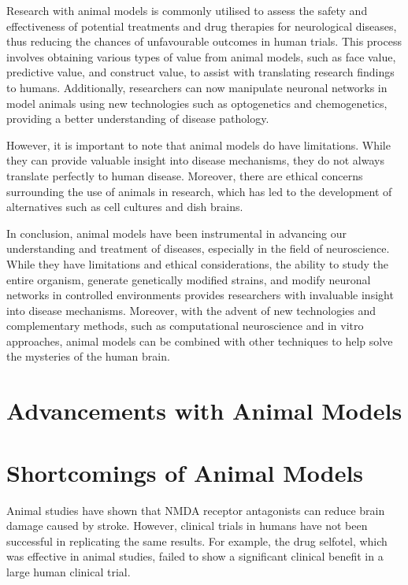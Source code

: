 \documentclass[10pt]{article}
\begin{document}
\begin{sloppypar}
  Research with animal models is commonly utilised to assess the safety and effectiveness of potential treatments and drug therapies for neurological diseases, thus reducing the chances of unfavourable outcomes in human trials. This process involves obtaining various types of value from animal models, such as face value, predictive value, and construct value, to assist with translating research findings to humans. Additionally, researchers can now manipulate neuronal networks in model animals using new technologies such as optogenetics and chemogenetics, providing a better understanding of disease pathology.

  However, it is important to note that animal models do have limitations. While they can provide valuable insight into disease mechanisms, they do not always translate perfectly to human disease. Moreover, there are ethical concerns surrounding the use of animals in research, which has led to the development of alternatives such as cell cultures and dish brains.

  In conclusion, animal models have been instrumental in advancing our understanding and treatment of diseases, especially in the field of neuroscience. While they have limitations and ethical considerations, the ability to study the entire organism, generate genetically modified strains, and modify neuronal networks in controlled environments provides researchers with invaluable insight into disease mechanisms. Moreover, with the advent of new technologies and complementary methods, such as computational neuroscience and in vitro approaches, animal models can be combined with other techniques to help solve the mysteries of the human brain.

  \section{Advancements with Animal Models}
  \label{sec:advancements}

  \section{Shortcomings of Animal Models}
  \label{sec:shortcomings}

  Animal studies have shown that NMDA receptor antagonists can reduce brain damage caused by stroke. However, clinical trials in humans have not been successful in replicating the same results. For example, the drug selfotel, which was effective in animal studies, failed to show a significant clinical benefit in a large human clinical trial.


\end{sloppypar}
\end{document}
